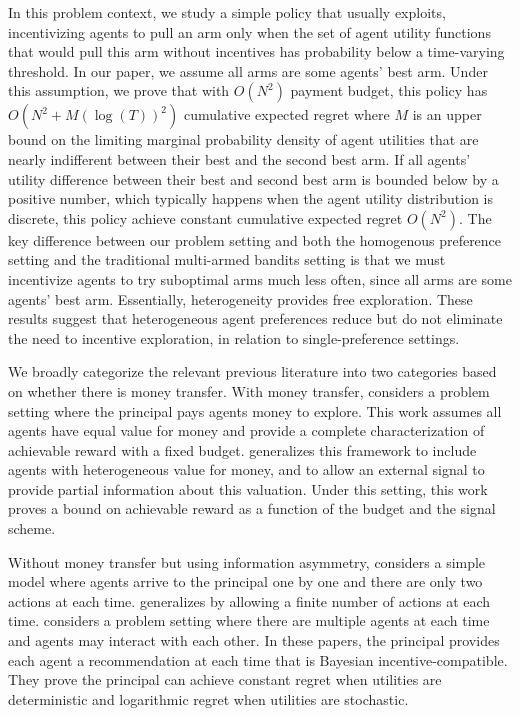 \documentclass{article}
\begin{document}

In this problem context, we study a simple policy that usually exploits, incentivizing agents to pull an arm only when the set of agent utility functions that would pull this arm without incentives has probability below a time-varying threshold. In our paper, we assume all arms are some agents' best arm. Under this assumption, we prove that with $O(N^2)$ payment budget, this policy has $O(N^2+M(\log(T))^2)$ cumulative expected regret where $M$ is an upper bound on the limiting marginal probability density of agent utilities that are nearly indifferent between their best and the second best arm. If all agents' utility difference between their best and second best arm is bounded below by a positive number, which typically happens when the agent utility distribution is discrete, this policy achieve constant cumulative expected regret $O(N^2)$. The key difference between our problem setting and both the homogenous preference setting and the traditional multi-armed bandits setting is that we must incentivize agents to try suboptimal arms much less often, since all arms are some agents' best arm.  Essentially, heterogeneity provides free exploration.  These results suggest that heterogeneous agent preferences reduce but do not eliminate the need to incentive exploration, in relation to single-preference settings. 

We broadly categorize the relevant previous literature into two categories based on whether there is money transfer.
With money transfer, \cite{frazier2014incentivizing} considers a problem setting where the principal pays agents money to explore. This work assumes all agents have equal value for money and provide a complete characterization of achievable reward with a fixed budget. \cite{han2015incentivizing} generalizes this framework to include agents with heterogeneous value for money, and to allow an external signal to provide partial information about this valuation. Under this setting, this work proves a bound on achievable reward as a function of the budget and the signal scheme.

Without money transfer but using information asymmetry, \cite{kremer2014implementing} considers a simple model where agents arrive to the principal one by one and there are only two actions at each time. \cite{mansour2015bayesian} generalizes \cite{kremer2014implementing} by allowing a finite number of actions at each time. \cite{mansour2016bayesian} considers a problem setting where there are multiple agents at each time and agents may interact with each other. In these papers, the principal provides each agent a recommendation at each time that is Bayesian incentive-compatible. They prove the principal can achieve constant regret when utilities are deterministic and logarithmic regret when utilities are stochastic.
\end{document}
